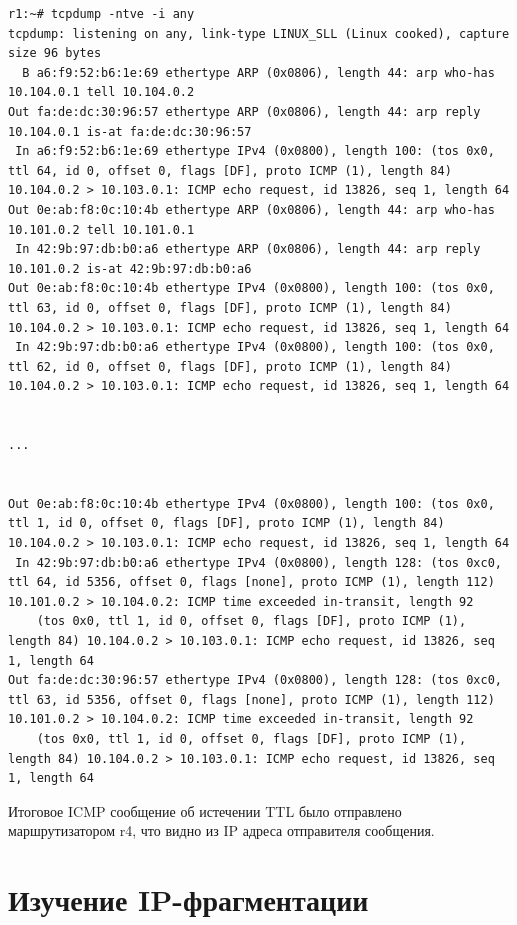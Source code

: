 \documentclass[a4paper,12pt]{article}
\begin{document}
\begin{Verbatim}
r1:~# tcpdump -ntve -i any
tcpdump: listening on any, link-type LINUX_SLL (Linux cooked), capture size 96 bytes
  B a6:f9:52:b6:1e:69 ethertype ARP (0x0806), length 44: arp who-has 10.104.0.1 tell 10.104.0.2
Out fa:de:dc:30:96:57 ethertype ARP (0x0806), length 44: arp reply 10.104.0.1 is-at fa:de:dc:30:96:57
 In a6:f9:52:b6:1e:69 ethertype IPv4 (0x0800), length 100: (tos 0x0, ttl 64, id 0, offset 0, flags [DF], proto ICMP (1), length 84) 10.104.0.2 > 10.103.0.1: ICMP echo request, id 13826, seq 1, length 64
Out 0e:ab:f8:0c:10:4b ethertype ARP (0x0806), length 44: arp who-has 10.101.0.2 tell 10.101.0.1
 In 42:9b:97:db:b0:a6 ethertype ARP (0x0806), length 44: arp reply 10.101.0.2 is-at 42:9b:97:db:b0:a6
Out 0e:ab:f8:0c:10:4b ethertype IPv4 (0x0800), length 100: (tos 0x0, ttl 63, id 0, offset 0, flags [DF], proto ICMP (1), length 84) 10.104.0.2 > 10.103.0.1: ICMP echo request, id 13826, seq 1, length 64
 In 42:9b:97:db:b0:a6 ethertype IPv4 (0x0800), length 100: (tos 0x0, ttl 62, id 0, offset 0, flags [DF], proto ICMP (1), length 84) 10.104.0.2 > 10.103.0.1: ICMP echo request, id 13826, seq 1, length 64


...


Out 0e:ab:f8:0c:10:4b ethertype IPv4 (0x0800), length 100: (tos 0x0, ttl 1, id 0, offset 0, flags [DF], proto ICMP (1), length 84) 10.104.0.2 > 10.103.0.1: ICMP echo request, id 13826, seq 1, length 64
 In 42:9b:97:db:b0:a6 ethertype IPv4 (0x0800), length 128: (tos 0xc0, ttl 64, id 5356, offset 0, flags [none], proto ICMP (1), length 112) 10.101.0.2 > 10.104.0.2: ICMP time exceeded in-transit, length 92
	(tos 0x0, ttl 1, id 0, offset 0, flags [DF], proto ICMP (1), length 84) 10.104.0.2 > 10.103.0.1: ICMP echo request, id 13826, seq 1, length 64
Out fa:de:dc:30:96:57 ethertype IPv4 (0x0800), length 128: (tos 0xc0, ttl 63, id 5356, offset 0, flags [none], proto ICMP (1), length 112) 10.101.0.2 > 10.104.0.2: ICMP time exceeded in-transit, length 92
	(tos 0x0, ttl 1, id 0, offset 0, flags [DF], proto ICMP (1), length 84) 10.104.0.2 > 10.103.0.1: ICMP echo request, id 13826, seq 1, length 64

\end{Verbatim}

Итоговое ICMP сообщение об истечении TTL было отправлено маршрутизатором r4, что видно из IP адреса отправителя сообщения.

\section{Изучение IP-фрагментации}
\end{document}
